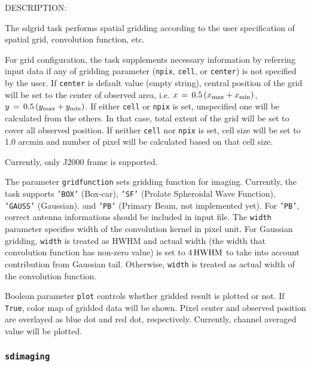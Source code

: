 DESCRIPTION:

The sdgrid task performs spatial gridding according to the user 
specification of spatial grid, convolution function, etc.

For grid configuration, the task supplements necessary information 
by referring input data if any of gridding parameter ({\tt npix}, 
{\tt cell}, or {\tt center}) is not specified by the user. 
If {\tt center} is 
default value (empty string), central position of the grid will be 
set to the center of observed area, i.e. 
$ x \, = \, 0.5 \, (x_{\rm max} + x_{\rm min}) $, 
$ y \, = \, 0.5 \, (y_{\rm max} + y_{\rm min}) $. 
If either {\tt cell} or {\tt npix} is set, unspecified 
one will be calculated from the others. In that case, total extent of 
the grid will be set to cover all observed position. If neither {\tt cell}
nor {\tt npix} is set, cell size will be set to 1.0 arcmin and number of 
pixel will be calculated based on that cell size.
 
Currently, only J2000 frame is supported.
 
The parameter {\tt gridfunction} sets gridding function for imaging. 
Currently, the task supports {\tt 'BOX'} (Box-car), {\tt 'SF'} (Prolate 
Spheroidal Wave Function), {\tt 'GAUSS'} (Gaussian). and {\tt 'PB'} 
(Primary Beam, not implemented yet). For {\tt 'PB'}, correct 
antenna informations should be included in input file. 
The {\tt width} parameter specifies width of the convolution kernel 
in pixel unit. For Gaussian gridding, {\tt width} is treated as HWHM 
and actual width (the width that convolution function has non-zero 
value) is set to $ 4 \, {\rm HWHM} $ to take into account contribution from 
Gaussian tail. Otherwise, {\tt width} is treated as actual width of the 
convolution function. 

Boolean parameter {\tt plot} controls whether gridded result is plotted 
or not. If {\tt True}, color map of gridded data will be shown. Pixel 
center and observed position are overlayed as blue dot and red dot, 
respectively. Currently, channel averaged value will be plotted.



\subsubsection{{\tt sdimaging}}
\label{section:sd.sdtasks.tasks.sdimaging}

